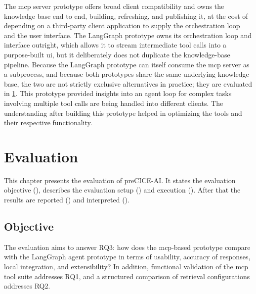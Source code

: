 \documentclass[
  numbers=noenddot,
  english,
  a4paper,
  twoside,
  bibliography=totoc,
  headsepline,
  cleardoublepage=empty,
  parskip=half,
  draft=false
]{scrbook}
\theoremstyle{break}
\renewcommand{\_}{\textunderscore\allowbreak}
\begin{document}
The \gls{mcp} server prototype offers broad client compatibility and owns the knowledge base end
to end, building, refreshing, and publishing it, at the cost of depending on a third-party
client application to supply the orchestration loop and the user interface.
The LangGraph prototype owns its orchestration loop and interface outright, which allows it to
stream intermediate tool calls into a purpose-built \gls{ui}, but it deliberately does not
duplicate the knowledge-base pipeline.
Because the LangGraph prototype can itself consume the \gls{mcp} server as a subprocess, and
because both prototypes share the same underlying knowledge base, the two are not strictly
exclusive alternatives in practice; they are evaluated in \cref{sec:evaluation}.
This prototype provided insights into an agent loop for complex tasks involving 
multiple tool calls are being handled into different clients. The understanding after 
building this prototype helped in optimizing the tools and 
their respective functionality.


\chapter{Evaluation}\label{sec:evaluation}

This chapter presents the evaluation of preCICE-AI. It states the evaluation objective (), describes the evaluation setup () and 
execution (). After that the results are reported () and interpreted ().

\section{Objective}\label{sec:evaluation:objective}

The evaluation aims to answer RQ3: how does the \gls{mcp}-based prototype compare with the
LangGraph agent prototype in terms of usability, accuracy of responses, local integration, and
extensibility?
In addition, functional validation of the \gls{mcp} tool suite addresses RQ1, and a structured
comparison of retrieval configurations addresses RQ2.
\end{document}
